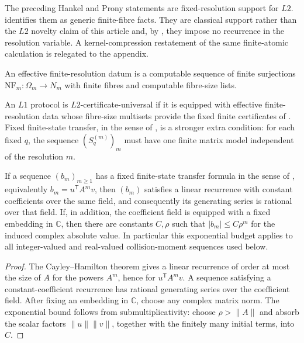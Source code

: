 The preceding Hankel and Prony statements are fixed-resolution support for
\(L2\).   identifies them as generic finite-fibre
facts.  They are classical support rather than the \(L2\) novelty claim of this article and, by
, they impose no recurrence in the
resolution variable.  A kernel-compression restatement of the same finite-atomic
calculation is relegated to the appendix.

\begin{definition}\label{def:effective-resolution-data}
An effective finite-resolution datum is a computable sequence of finite
surjections \(\mathrm{NF}_m\colon\Omega_m\to N_m\) with finite fibres and
computable fibre-size lists.
\end{definition}

\begin{definition}\label{def:cert-univ}
An \(L1\) protocol is \(L2\)-certificate-universal if it is equipped with
effective finite-resolution data whose fibre-size multisets provide the fixed
finite certificates of .  Fixed
finite-state transfer, in the sense of ,
is a stronger extra condition: for each fixed \(q\), the sequence
\((S_q^{(m)})_m\) must have one finite matrix model independent of the resolution
\(m\).
\end{definition}

\begin{proposition}
\label{prop:finite-state-coefficient-budget}
If a sequence \((b_m)_{m\ge1}\) has a fixed finite-state transfer formula in the
sense of , equivalently
\(b_m=u^{\mathsf T}A^m v\), then \((b_m)\) satisfies a linear recurrence with
constant coefficients over the same field, and consequently its generating
series is rational over that field.  If, in addition, the coefficient field is
equipped with a fixed embedding in \(\mathbb C\), then there are constants
\(C,\rho\) such that \(|b_m|\le C\rho^m\) for the induced complex absolute value.
In particular this exponential budget applies to all integer-valued and
real-valued collision-moment sequences used below.
\end{proposition}

\begin{proof}
The Cayley--Hamilton theorem gives a linear recurrence of order at most the
size of \(A\) for the powers \(A^m\), hence for \(u^{\mathsf T}A^m v\).  A
sequence satisfying a constant-coefficient recurrence has rational generating
series over the coefficient field.  After fixing an embedding in \(\mathbb C\),
choose any complex matrix norm.  The exponential bound follows from
submultiplicativity: choose \(\rho>\|A\|\) and absorb the scalar factors
\(\|u\|\|v\|\), together with the finitely many initial terms, into \(C\).
\end{proof}

